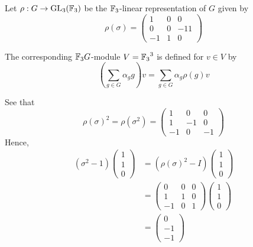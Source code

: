 \documentclass{unswmaths}
\begin{document}
\begin{definition}
    Let $\rho:G \rightarrow \operatorname{GL}_3({\mathbb{F}_3})$ be the ${\mathbb{F}_3}$-linear representation
    of $G$ given by 
    \begin{equation*}
        \rho(\sigma) = \begin{pmatrix} 1 & 0 & 0\\ 
            0 & 0 & -11\\
            -1 & 1 & 0
        \end{pmatrix}
    \end{equation*}
    
    The corresponding ${\mathbb{F}_3} G$-module $V = {\mathbb{F}_3}^3$ is defined for $v \in V$ by
    \begin{equation*}
        \left(\sum_{g\in G} \alpha_g g\right)v = \sum_{g\in G}\alpha_g\rho(g)v
    \end{equation*} 
    
    
    See that
    \begin{equation*}
        \rho(\sigma)^2 = \rho(\sigma^2) = \begin{pmatrix}
            1 & 0 & 0\\
            1 & -1 & 0\\
            -1 & 0 & -1
        \end{pmatrix}   
    \end{equation*}
    Hence,
    \begin{align*}
        (\sigma^2-1)\begin{pmatrix} 1\\1\\0\end{pmatrix} &= ( \rho(\sigma)^2-I)\begin{pmatrix} 1\\1\\0\end{pmatrix}\\
        &=\begin{pmatrix}
            0 & 0 & 0\\
            1 & 1 & 0\\
            -1 & 0 & 1
        \end{pmatrix}
        \begin{pmatrix}
            1\\1\\0
        \end{pmatrix}\\
        &=
        \begin{pmatrix}
            0\\-1\\-1
        \end{pmatrix}
    \end{align*}
    
\end{definition}
\end{document}
